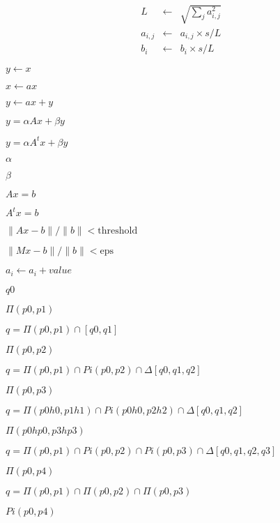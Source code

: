 \documentclass{article}
\begin{document}
\[ \begin{array}{lcl} L & \leftarrow & \sqrt{\sum_{j} a_{i,j}^2} \\ a_{i,j} & \leftarrow & a_{i,j} \times s / L\\ b_i & \leftarrow & b_i \times s / L \end{array} \]
\pagebreak

$ y \leftarrow x $
\pagebreak

$ x \leftarrow a x $
\pagebreak

$ y \leftarrow a x + y $
\pagebreak

$ y = \alpha A x + \beta y $
\pagebreak

$ y = \alpha A^t x + \beta y $
\pagebreak

$ \alpha $
\pagebreak

$ \beta $
\pagebreak

$ A x = b $
\pagebreak

$ A^t x = b $
\pagebreak

$ \| A x - b \| / \| b \| < \mbox{threshold} $
\pagebreak

$ \| Mx - b \| / \| b \| < \mbox{eps}$
\pagebreak

$ a_i \leftarrow a_i + value $
\pagebreak

$ q0 $
\pagebreak

$ \Pi(p0,p1) $
\pagebreak

$ q = \Pi(p0,p1) \cap [q0,q1] $
\pagebreak

$ \Pi(p0,p2) $
\pagebreak

$ q = \Pi(p0,p1) \cap Pi(p0,p2) \cap \Delta[q0,q1,q2] $
\pagebreak

$ \Pi(p0,p3) $
\pagebreak

$ q = \Pi(p0 h0,p1 h1) \cap Pi(p0 h0,p2 h2) \cap \Delta[q0, q1, q2] $
\pagebreak

$ \Pi(p0 hp0,p3 hp3) $
\pagebreak

$ q = \Pi(p0,p1) \cap Pi(p0,p2) \cap Pi(p0,p3) \cap \Delta[q0,q1,q2,q3] $
\pagebreak

$ \Pi(p0,p4) $
\pagebreak

$ q = \Pi(p0,p1) \cap \Pi(p0,p2) \cap \Pi(p0,p3) $
\pagebreak

$ Pi(p0,p4) $
\pagebreak
\end{document}
